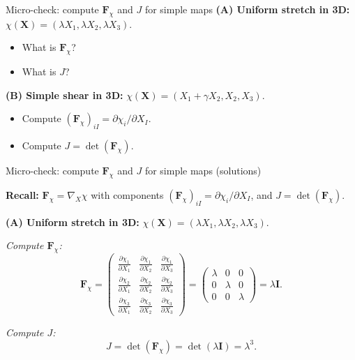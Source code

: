 \documentclass[aspectratio=169]{beamer}
\newcommand{\X}{\bm{X}}
\newcommand{\I}{\bm{I}}
\newcommand{\gradX}{\nabla_{\!X}}
\newcommand{\Fdef}{\bm{F}_{\chi}}  %
\begin{document}
\begin{frame}{Micro-check: compute \(\Fdef\) and \(J\) for simple maps}
\small
\textbf{(A) Uniform stretch in 3D:} \(\chi(\X) = (\lambda X_1, \lambda X_2, \lambda X_3)\).
\begin{itemize}
\item What is \(\Fdef\)?
\item What is \(J\)?
\end{itemize}

\medskip
\textbf{(B) Simple shear in 3D:} \(\chi(\X) = (X_1 + \gamma X_2, X_2, X_3)\).
\begin{itemize}
\item Compute \((\Fdef)_{iI}=\partial \chi_i/\partial X_I\).
\item Compute \(J=\det(\Fdef)\).
\end{itemize}


\end{frame}

\begin{frame}{Micro-check: compute \(\Fdef\) and \(J\) for simple maps (solutions)}
\small

\textbf{Recall:} \(\Fdef = \gradX \chi\) with components \((\Fdef)_{iI}=\partial \chi_i/\partial X_I\), and \(J=\det(\Fdef)\).

\medskip
\textbf{(A) Uniform stretch in 3D:} \(\chi(\X) = (\lambda X_1, \lambda X_2, \lambda X_3)\).

\medskip
\emph{Compute \(\Fdef\):}
\[
\Fdef =
\begin{pmatrix}
\frac{\partial \chi_1}{\partial X_1} & \frac{\partial \chi_1}{\partial X_2} & \frac{\partial \chi_1}{\partial X_3}\\
\frac{\partial \chi_2}{\partial X_1} & \frac{\partial \chi_2}{\partial X_2} & \frac{\partial \chi_2}{\partial X_3}\\
\frac{\partial \chi_3}{\partial X_1} & \frac{\partial \chi_3}{\partial X_2} & \frac{\partial \chi_3}{\partial X_3}
\end{pmatrix}
=
\begin{pmatrix}
\lambda & 0 & 0\\
0 & \lambda & 0\\
0 & 0 & \lambda
\end{pmatrix}
= \lambda \I.
\]

\emph{Compute \(J\):}
\[
J=\det(\Fdef)=\det(\lambda \I)=\lambda^3.
\]
\end{frame}
\end{document}
